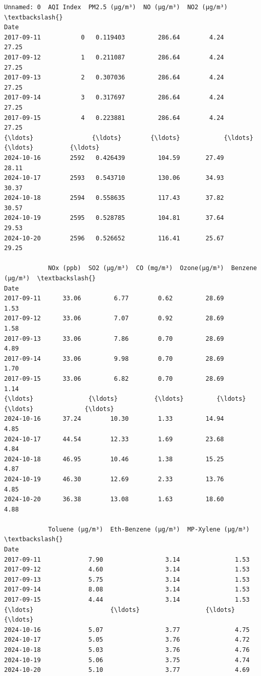 \documentclass[11pt]{article}
\makeatletter
\newcommand{\boxspacing}{\kern\kvtcb@left@rule\kern\kvtcb@boxsep}
\newcommand{\prompt}[4]{
        {\ttfamily\llap{{\color{#2}[#3]:\hspace{3pt}#4}}\vspace{-\baselineskip}}
    }
\makeatother
\begin{document}
            \begin{tcolorbox}[breakable, size=fbox, boxrule=.5pt, pad at break*=1mm, opacityfill=0]
\prompt{Out}{outcolor}{32}{\boxspacing}
\begin{Verbatim}[commandchars=\\\{\}]
            Unnamed: 0  AQI Index  PM2.5 (µg/m³)  NO (µg/m³)  NO2 (µg/m³)  \textbackslash{}
Date
2017-09-11           0   0.119403         286.64        4.24        27.25
2017-09-12           1   0.211087         286.64        4.24        27.25
2017-09-13           2   0.307036         286.64        4.24        27.25
2017-09-14           3   0.317697         286.64        4.24        27.25
2017-09-15           4   0.223881         286.64        4.24        27.25
{\ldots}                {\ldots}        {\ldots}            {\ldots}         {\ldots}          {\ldots}
2024-10-16        2592   0.426439         104.59       27.49        28.11
2024-10-17        2593   0.543710         130.06       34.93        30.37
2024-10-18        2594   0.558635         117.43       37.82        30.57
2024-10-19        2595   0.528785         104.81       37.64        29.53
2024-10-20        2596   0.526652         116.41       25.67        29.25

            NOx (ppb)  SO2 (µg/m³)  CO (mg/m³)  Ozone(µg/m³)  Benzene (µg/m³)  \textbackslash{}
Date
2017-09-11      33.06         6.77        0.62         28.69             1.53
2017-09-12      33.06         7.07        0.92         28.69             1.58
2017-09-13      33.06         7.86        0.70         28.69             4.89
2017-09-14      33.06         9.98        0.70         28.69             1.70
2017-09-15      33.06         6.82        0.70         28.69             1.14
{\ldots}               {\ldots}          {\ldots}         {\ldots}           {\ldots}              {\ldots}
2024-10-16      37.24        10.30        1.33         14.94             4.85
2024-10-17      44.54        12.33        1.69         23.68             4.84
2024-10-18      46.95        10.46        1.38         15.25             4.87
2024-10-19      46.30        12.69        2.33         13.76             4.85
2024-10-20      36.38        13.08        1.63         18.60             4.88

            Toluene (µg/m³)  Eth-Benzene (µg/m³)  MP-Xylene (µg/m³)  \textbackslash{}
Date
2017-09-11             7.90                 3.14               1.53
2017-09-12             4.60                 3.14               1.53
2017-09-13             5.75                 3.14               1.53
2017-09-14             8.08                 3.14               1.53
2017-09-15             4.44                 3.14               1.53
{\ldots}                     {\ldots}                  {\ldots}                {\ldots}
2024-10-16             5.07                 3.77               4.75
2024-10-17             5.05                 3.76               4.72
2024-10-18             5.03                 3.76               4.76
2024-10-19             5.06                 3.75               4.74
2024-10-20             5.10                 3.77               4.69


\end{Verbatim}
\end{tcolorbox}
\end{document}
